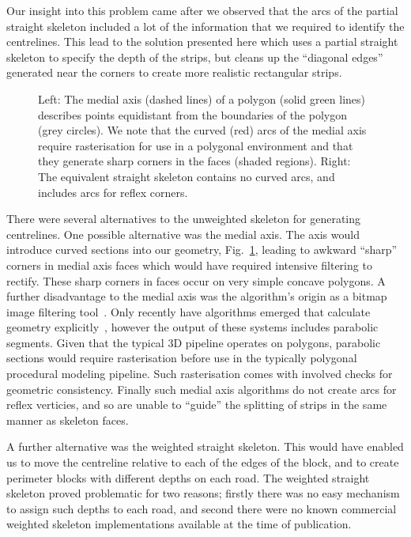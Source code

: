 Our insight into this problem came after we observed that the arcs of the partial straight skeleton included a lot of the information that we required to identify the centrelines. This lead to the solution presented here which uses a partial straight skeleton to specify the depth of the strips, but cleans up the ``diagonal edges'' generated near the corners to create more realistic rectangular strips.

\begin{figure}
\centering
\def\svgwidth{0.7\columnwidth}

\caption[A perimeter block's depth]{\label{fig:medialIssues}Left: The medial axis (dashed lines) of a polygon (solid green lines) describes points equidistant from the boundaries of the polygon (grey circles). We note that the curved (red) arcs of the medial axis require rasterisation for use in a polygonal environment and that they generate sharp corners in the faces (shaded regions). Right: The equivalent straight skeleton contains no curved arcs, and includes arcs for reflex corners.}
\end{figure}


There were several alternatives to the unweighted skeleton for generating centrelines. One possible alternative was the medial axis. The axis would introduce curved sections into our geometry, Fig.~\ref{fig:medialIssues}, leading to awkward ``sharp'' corners in medial axis faces which would have required intensive filtering to rectify. These sharp corners in faces occur on very simple concave polygons. A further disadvantage to the medial axis was the algorithm's origin as a bitmap image filtering tool~\cite{Blum67}. Only recently have algorithms emerged that calculate geometry explicitly~\cite{Joan1999,Ramanathan2003}, however the output of these systems includes parabolic segments. Given that the typical 3D pipeline operates on polygons, parabolic sections would require rasterisation before use in the typically polygonal procedural modeling pipeline. Such rasterisation comes with involved checks for geometric consistency. Finally such medial axis algorithms do not create arcs for reflex verticies, and so are unable to ``guide'' the splitting of strips in the same manner as skeleton faces.
\kawt

A further alternative was the weighted straight skeleton. This would have enabled us to move the centreline relative to each of the edges of the block, and to create perimeter blocks with different depths on each road. The weighted straight skeleton proved problematic for two reasons; firstly there was no easy mechanism to assign such depths to each road, and second there were no known commercial weighted skeleton implementations available at the time of publication.

